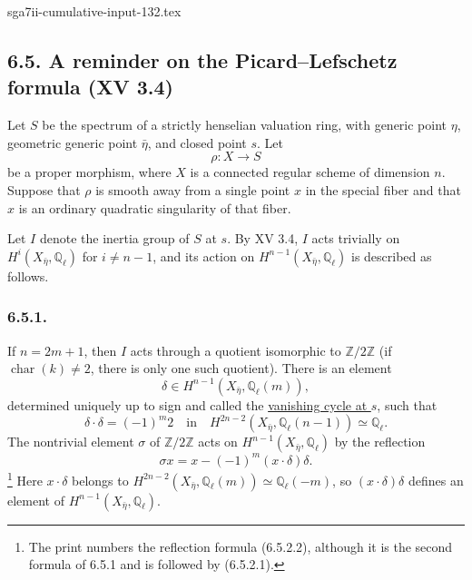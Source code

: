 \begin{filecontents*}{sga7ii-cumulative-input-132.tex}
\subsection*{6.5. A reminder on the Picard--Lefschetz formula (XV 3.4)}

Let $S$ be the spectrum of a strictly henselian valuation ring, with
generic point $\eta$, geometric generic point $\bar\eta$, and closed
point $s$.  Let
\[
\rho:X\longrightarrow S
\]
be a proper morphism, where $X$ is a connected regular scheme of
dimension $n$.  Suppose that $\rho$ is smooth away from a single point
$x$ in the special fiber and that $x$ is an ordinary quadratic
singularity of that fiber.

Let $I$ denote the inertia group of $S$ at $s$.  By XV 3.4, $I$ acts
trivially on $H^i(X_{\bar\eta},\mathbb Q_\ell)$ for $i\ne n-1$, and its
action on $H^{n-1}(X_{\bar\eta},\mathbb Q_\ell)$ is described as follows.

\subsubsection*{6.5.1.}
If $n=2m+1$, then $I$ acts through a quotient isomorphic to
$\mathbb Z/2\mathbb Z$ (if $\operatorname{char}(k)\ne2$, there is only
one such quotient).  There is an element
\[
\delta\in H^{n-1}(X_{\bar\eta},\mathbb Q_\ell(m)),
\]
determined uniquely up to sign and called the \underline{vanishing
cycle at $s$}, such that
\begin{equation}\tag{6.5.1.1}
\delta\cdot\delta=(-1)^m2
\quad\text{in}\quad
H^{2n-2}(X_{\bar\eta},\mathbb Q_\ell(n-1))\simeq\mathbb Q_\ell.
\end{equation}
The nontrivial element $\sigma$ of $\mathbb Z/2\mathbb Z$ acts on
$H^{n-1}(X_{\bar\eta},\mathbb Q_\ell)$ by the reflection
\begin{equation}\tag{6.5.1.2}
\sigma x=x-(-1)^m(x\cdot\delta)\delta.
\end{equation}
\footnote{The print numbers the reflection formula (6.5.2.2), although
it is the second formula of 6.5.1 and is followed by (6.5.2.1).}
Here $x\cdot\delta$ belongs to
$H^{2n-2}(X_{\bar\eta},\mathbb Q_\ell(m))\simeq\mathbb Q_\ell(-m)$,
so $(x\cdot\delta)\delta$ defines an element of
$H^{n-1}(X_{\bar\eta},\mathbb Q_\ell)$.


\end{filecontents*}
